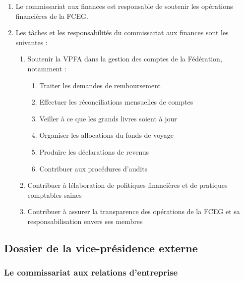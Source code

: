 \begin{enumerate}
 \item
  Le commissariat aux finances est responsable de soutenir les opérations financières de la FCEG.
 \item
  Les tâches et les responsabilités du commissariat aux finances sont les suivantes :

  \begin{enumerate}
   \item
    Soutenir la VPFA dans la gestion des comptes de la Fédération, notamment :

    \begin{enumerate}
     \item
      Traiter les demandes de remboursement
     \item
      Effectuer les réconciliations mensuelles de comptes
     \item
      Veiller à ce que les grands livres soient à jour
     \item
      Organiser les allocations du fonds de voyage
     \item
      Produire les déclarations de revenus
     \item
      Contribuer aux procédures d’audits
    \end{enumerate}

   \item
    Contribuer à l\textquotesingle élaboration de politiques financières et de pratiques comptables saines
   \item
    Contribuer à assurer la transparence des opérations de la FCEG et sa responsabilisation envers ses membres
  \end{enumerate}
\end{enumerate}

\subsection{Dossier de la vice-présidence externe}
\label{portefeuille-vpe}

\subsubsection{Le commissariat aux relations d’entreprise}
\label{lela-commissaire-aux-relations-dentreprise}

